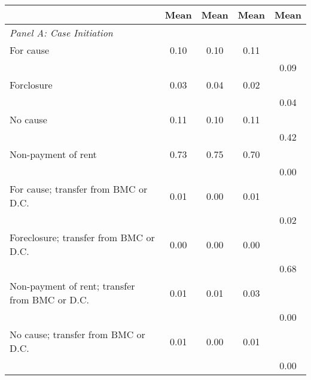 {
\def\sym#1{\ifmmode^{#1}\else\(^{#1}\)\fi}
\begin{tabular}{l*{4}{c}}
\toprule
                    &        Mean&        Mean&        Mean&        Mean\\
\midrule
\emph{Panel A: Case Initiation}&            &            &            &            \\
\hspace{0.25cm}For cause&        0.10&        0.10&        0.11&            \\
                    &            &            &            &        0.09\\
\hspace{0.25cm}Forclosure&        0.03&        0.04&        0.02&            \\
                    &            &            &            &        0.04\\
\hspace{0.25cm}No cause&        0.11&        0.10&        0.11&            \\
                    &            &            &            &        0.42\\
\hspace{0.25cm}Non-payment of rent&        0.73&        0.75&        0.70&            \\
                    &            &            &            &        0.00\\
\hspace{0.25cm}For cause; transfer from BMC or D.C.&        0.01&        0.00&        0.01&            \\
                    &            &            &            &        0.02\\
\hspace{0.25cm}Foreclosure; transfer from BMC or D.C.&        0.00&        0.00&        0.00&            \\
                    &            &            &            &        0.68\\
\hspace{0.25cm}Non-payment of rent; transfer from BMC or D.C.&        0.01&        0.01&        0.03&            \\
                    &            &            &            &        0.00\\
\hspace{0.25cm}No cause; transfer from BMC or D.C.&        0.01&        0.00&        0.01&            \\
                    &            &            &            &        0.00\\

\end{tabular}}
